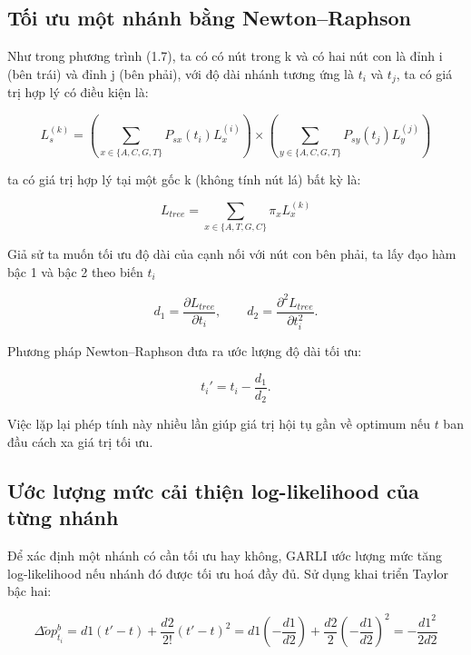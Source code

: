 \documentclass[12pt,a4paper]{report}
\begin{document}
\subsection{Tối ưu một nhánh bằng Newton–Raphson}

Như trong phương trình (1.7), ta có có nút trong k và có hai nút con là đỉnh i (bên trái) và đỉnh j (bên phải), với độ dài nhánh tương ứng là \(t_i\) và \(t_j\), ta có giá trị hợp lý có điều kiện là:

\begin{equation}
    L_s^{(k)} = \left( \sum_{x \in \{A,C,G,T\}} P_{sx}(t_i) L_x^{(i)} \right) \times \left( \sum_{y \in \{A,C,G,T\}} P_{sy}(t_j) L_y^{(j)} \right)
    \label{eq:felsenstein_recursion}
\end{equation}

ta có giá trị hợp lý tại một gốc k (không tính nút lá) bất kỳ là:



\begin{equation}
    L_{tree} = \sum_{x \in \{A,T,G,C\}} \pi_x L_x^{(k)}
    \label{eq:placeholder_label}
\end{equation}

Giả sử ta muốn tối ưu độ dài của cạnh nối với nút con bên phải, ta lấy đạo hàm bậc 1 và bậc 2 theo biến \(t_i\)

\[
d_1 = \frac{\partial L_{tree}}{\partial t_i}, \qquad 
d_2 = \frac{\partial^2 L_{tree}}{\partial t_i^2}.
\]

Phương pháp Newton–Raphson đưa ra ước lượng độ dài tối ưu:

\[
t_i' = t_i - \frac{d_1}{d_2}.
\]

Việc lặp lại phép tính này nhiều lần giúp giá trị hội tụ gần về optimum nếu $t$ ban đầu
cách xa giá trị tối ưu.

\subsection{Ước lượng mức cải thiện log-likelihood của từng nhánh}

Để xác định một nhánh có cần tối ưu hay không, GARLI ước lượng mức tăng log-likelihood nếu nhánh đó được tối ưu hoá đầy đủ. Sử dụng khai triển Taylor bậc hai:

\begin{equation}
    \Delta \tilde{o}p_{t_i}^b = d1(t' - t) + \frac{d2}{2!}(t' - t)^2 = d1\!\left(-\frac{d1}{d2}\right) + \frac{d2}{2}\left(-\frac{d1}{d2}\right)^2 = -\frac{d1^2}{2d2}
    \label{eq:placeholder_label}
\end{equation}
\end{document}
